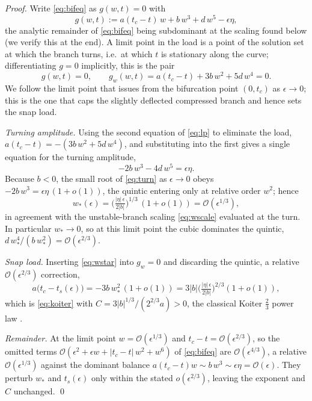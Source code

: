 \begin{proof}
    Write \eqref{eq:bifeq} as $g(w,t)=0$ with
    \begin{equation*}
        g(w,t):=a(t_c-t)\,w+b\,w^3+d\,w^5-\epsilon\eta ,
    \end{equation*}
    the analytic remainder of \eqref{eq:bifeq} being subdominant at the scaling found below (we verify this at the
    end). A limit point in the load is a point of the solution set at which the branch turns, i.e.\ at which $t$ is
    stationary along the curve; differentiating $g=0$ implicitly, this is the pair
    \begin{equation}
        \label{eq:lp}
        g(w,t)=0, \qquad g_w(w,t)=a(t_c-t)+3b\,w^2+5d\,w^4=0 .
    \end{equation}
    We follow the limit point that issues from the bifurcation point $(0,t_c)$ as $\epsilon\to0$; this is the one that
    caps the slightly deflected compressed branch and hence sets the snap load.

    \emph{Turning amplitude.} Using the second equation of \eqref{eq:lp} to eliminate the load,
    $a(t_c-t)=-(3b\,w^2+5d\,w^4)$, and substituting into the first gives a single equation for the turning amplitude,
    \begin{equation}
        \label{eq:turn}
        -2b\,w^3-4d\,w^5=\epsilon\eta .
    \end{equation}
    Because $b<0$, the small root of \eqref{eq:turn} as $\epsilon\to0$ obeys $-2b\,w^3=\epsilon\eta\,(1+o(1))$, the
    quintic entering only at relative order $w^2$; hence
    \begin{equation}
        \label{eq:wstar}
        w_\ast(\epsilon)=\Big(\tfrac{|\eta|\,\epsilon}{2|b|}\Big)^{1/3}\,(1+o(1))=\mathcal{O}(\epsilon^{1/3}),
    \end{equation}
    in agreement with the unstable-branch scaling \eqref{eq:wscale} evaluated at the turn. In particular
    $w_\ast\to0$, so at this limit point the cubic dominates the quintic, $d\,w_\ast^4/(b\,w_\ast^2)=\mathcal{O}(\epsilon^{2/3})$.

    \emph{Snap load.} Inserting \eqref{eq:wstar} into $g_w=0$ and discarding the quintic, a relative
    $\mathcal{O}(\epsilon^{2/3})$ correction,
    \begin{equation*}
        a\big(t_c-t_s(\epsilon)\big)=-3b\,w_\ast^2\,(1+o(1))
        =3|b|\Big(\tfrac{|\eta|\,\epsilon}{2|b|}\Big)^{2/3}(1+o(1)),
    \end{equation*}
    which is \eqref{eq:koiter} with $C=3|b|^{1/3}/(2^{2/3}a)>0$, the classical Koiter $\tfrac23$ power law
    \cite{Koiter1945,GolubitskySchaeffer1985}.

    \emph{Remainder.} At the limit point $w=\mathcal{O}(\epsilon^{1/3})$ and $t_c-t=\mathcal{O}(\epsilon^{2/3})$, so the
    omitted terms $\mathcal{O}(\epsilon^2+\epsilon w+|t_c-t|\,w^2+w^6)$ of \eqref{eq:bifeq} are
    $\mathcal{O}(\epsilon^{4/3})$, a relative $\mathcal{O}(\epsilon^{1/3})$ against the dominant balance
    $a(t_c-t)w\sim b\,w^3\sim\epsilon\eta=\mathcal{O}(\epsilon)$. They perturb $w_\ast$ and $t_s(\epsilon)$ only within
    the stated $o(\epsilon^{2/3})$, leaving the exponent and $C$ unchanged. \qed
\end{proof}

